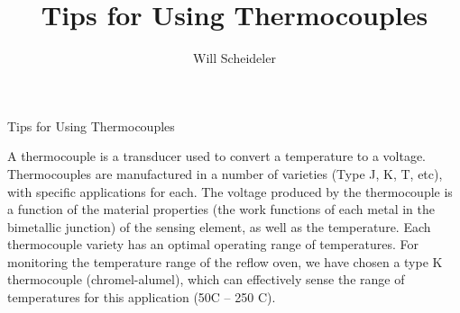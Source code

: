 \documentclass[10pt]{report}
\title{Tips for Using Thermocouples}
\author{Will Scheideler}
\begin{document}
   \maketitle
  Tips for Using Thermocouples
\par

A thermocouple is a transducer used to convert a temperature to a voltage. Thermocouples are manufactured in a number of varieties (Type J, K, T, etc), with specific applications for each. The voltage produced by the thermocouple is a function of the material properties (the work functions of each metal in the bimetallic junction) of the sensing element, as well as the temperature. Each thermocouple variety has an optimal operating range of temperatures. For monitoring the temperature range of the reflow oven, we have chosen a type K thermocouple (chromel-alumel), which can effectively sense the range of temperatures for this application (50C – 250 C).
\par
\end{document}
